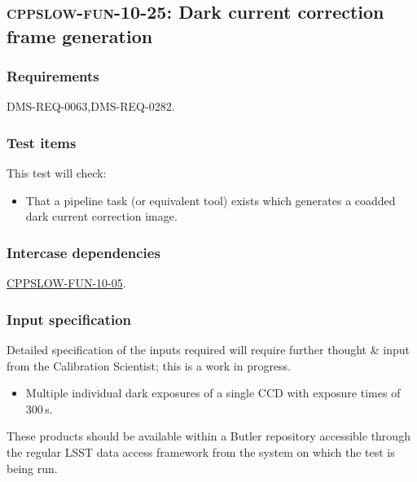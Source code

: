 \subsection{\textsc{cppslow-fun-10-25}: Dark current correction frame generation}
\label{cppslow-fun-10-25}

\subsubsection{Requirements}

DMS-REQ-0063,DMS-REQ-0282.

\subsubsection{Test items}

This test will check:

\begin{itemize}

  \item{That a pipeline task (or equivalent tool) exists which generates a
  coadded dark current correction image.}

\end{itemize}

\subsubsection{Intercase dependencies}

\hyperref[cppslow-fun-10-05]{CPPSLOW-FUN-10-05}.

\subsubsection{Input specification}

\begin{note}
Detailed specification of the inputs required will require further thought \&
input from the Calibration Scientist; this is a work in progress.
\end{note}

\begin{itemize}

  \item{Multiple individual dark exposures of a single CCD with exposure times
  of 300\,s.}

\end{itemize}

These products should be available within a Butler repository accessible
through the regular LSST data access framework from the system on which the test
is being run.

